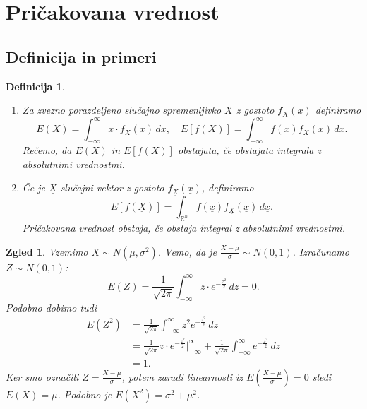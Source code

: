 \documentclass[10pt, a4paper]{article}
\newtheorem{defi}[izr]{Definicija}
\newenvironment{noticeB}{%
  \tcolorbox[%
  notitle,
  empty,
  enhanced,  %
  breakable,
  coltext=black,
  colback=white, 
  fontupper=\rmfamily,
  noparskip,
  sharp corners,
  boxrule=-1pt,  %
  frame hidden,
  left=7pt,  %
  right=7pt,
  top=5pt,
  bottom=5pt,
  before skip=2.5ex plus 2pt,
  after skip=2.5ex plus 2pt,
  borderline west = {1.5pt}{-0.1pt}{blue!30!black}, %
  overlay unbroken and last={%
    \draw[color=black, line width=1.25pt]
    ($(frame.south west)+(1.pt, -0.1pt)$) -- ++(2em, 0);
  }
  ]}
{\endtcolorbox}
\newenvironment{definicija}{\begin{noticeB}\begin{defi}}{%
    \end{defi}\end{noticeB}}
\newtheorem{zgled}[izr]{Zgled}
\newcommand{\R}{\mathbb {R}}
\begin{document}
  \section{Pričakovana vrednost}

\subsection{Definicija in primeri}

\begin{definicija}
  \begin{enumerate}
    \item Za zvezno porazdeljeno slučajno spremenljivko $X$ z gostoto $f_X (x)$ definiramo 
      $$E(X) = \int_{-\infty} ^\infty x \cdot f_X (x)\, dx,\quad E[f(X)] = \int_{-\infty} ^\infty f(x) f_X(x)\, dx.$$
      Rečemo, da $E(X)$ in $E[f(X)]$ obstajata, če obstajata integrala z absolutnimi vrednostmi.
    \item Če je $\underline{X}$ slučajni vektor z gostoto $f_{\underline{X}} (\underline{x})$, definiramo 
    $$E[f(\underline{X})] = \int_{\R^n} {f(\underline{x})} f_{\underline{X}} (\underline{x})\, d\underline{x}.$$
    Pričakovana vrednost obstaja, če obstaja integral z absolutnimi vrednostmi.
  \end{enumerate}
\end{definicija}

\begin{zgled}
  Vzemimo $X \sim N(\mu, \sigma^2)$. Vemo, da je $\frac{X - \mu}{\sigma} \sim N(0, 1)$.
  Izračunamo $Z \sim N(0, 1)$:
  \begin{equation*}
    E(Z) = \frac{1}{\sqrt{2 \pi}} \int_{-\infty} ^\infty z \cdot e^{-\frac{z^2}{2}}\, dz = 0.
  \end{equation*}
  Podobno dobimo tudi 
  \begin{align*}
    E(Z^2) &= \frac{1}{\sqrt{2 \pi}} \int_{-\infty} ^\infty z^2 e^{-\frac{z^2}{2}}\, dz\\
    &= \frac{1}{\sqrt{2 \pi}} z \cdot e^{-\frac{z^2}{2}} \big|_{-\infty} ^\infty + \frac{1}{\sqrt{2 \pi}}\int_{-\infty} ^\infty e^{-\frac{z^2}{2}}\, dz\\
    &= 1.
  \end{align*}
  Ker smo označili $Z = \frac{X - \mu}{\sigma}$, potem zaradi linearnosti iz $E\left(\frac{X - \mu}{\sigma}\right) = 0$
  sledi $E(X) = \mu$. Podobno je $E(X^2) = \sigma^2 + \mu^2$.
\end{zgled}
\end{document}
